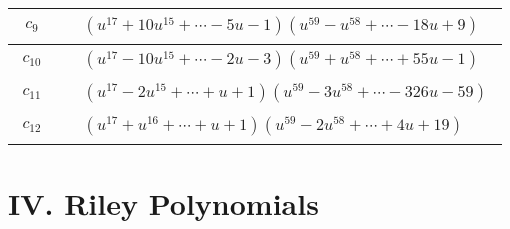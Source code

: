 \documentclass[1p]{elsarticle_modified}
\theoremstyle{definition}
\begin{document}
\begin{tabular}{m{50pt}|m{274pt}}
\hline $$\begin{aligned}c_{9}\end{aligned}$$&$\begin{aligned}
&(u^{17}+10 u^{15}+\cdots-5 u-1)(u^{59}- u^{58}+\cdots-18 u+9)
\end{aligned}$\\
\hline $$\begin{aligned}c_{10}\end{aligned}$$&$\begin{aligned}
&(u^{17}-10 u^{15}+\cdots-2 u-3)(u^{59}+u^{58}+\cdots+55 u-1)
\end{aligned}$\\
\hline $$\begin{aligned}c_{11}\end{aligned}$$&$\begin{aligned}
&(u^{17}-2 u^{15}+\cdots+u+1)(u^{59}-3 u^{58}+\cdots-326 u-59)
\end{aligned}$\\
\hline $$\begin{aligned}c_{12}\end{aligned}$$&$\begin{aligned}
&(u^{17}+u^{16}+\cdots+u+1)(u^{59}-2 u^{58}+\cdots+4 u+19)
\end{aligned}$\\
\hline
\end{tabular}\newpage\renewcommand{\arraystretch}{1}
\centering \section*{ IV. Riley Polynomials}
\end{document}
